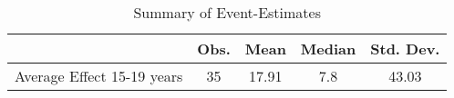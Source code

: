 \begin{table}[htbp]\centering
\def\sym#1{\ifmmode^{#1}\else\(^{#1}\)\fi}
\caption{Summary of Event-Estimates}
\begin{tabular}{l*{1}{cccc}}
\toprule
                    &        Obs.&        Mean&      Median&   Std. Dev.\\
\midrule
Average Effect 15-19 years&          35&       17.91&         7.8&       43.03\\
\bottomrule
\end{tabular}
\end{table}
